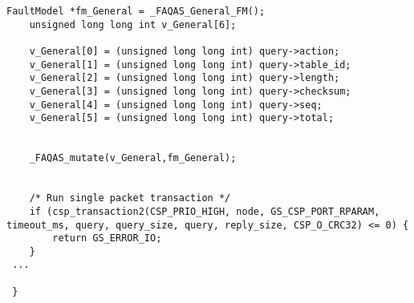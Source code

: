 \begin{lstlisting}[style=CStyle, caption=Example of extended data-driven mutation probe for libParam, label=GSLcover]
    FaultModel *fm_General = _FAQAS_General_FM();
    unsigned long long int v_General[6];

    v_General[0] = (unsigned long long int) query->action;
    v_General[1] = (unsigned long long int) query->table_id;
    v_General[2] = (unsigned long long int) query->length;
    v_General[3] = (unsigned long long int) query->checksum;
    v_General[4] = (unsigned long long int) query->seq;
    v_General[5] = (unsigned long long int) query->total;


    _FAQAS_mutate(v_General,fm_General);


    /* Run single packet transaction */
    if (csp_transaction2(CSP_PRIO_HIGH, node, GS_CSP_PORT_RPARAM, timeout_ms, query, query_size, query, reply_size, CSP_O_CRC32) <= 0) {
        return GS_ERROR_IO;
    }
 ... 
 
 }

\end{lstlisting}



%
%
%
